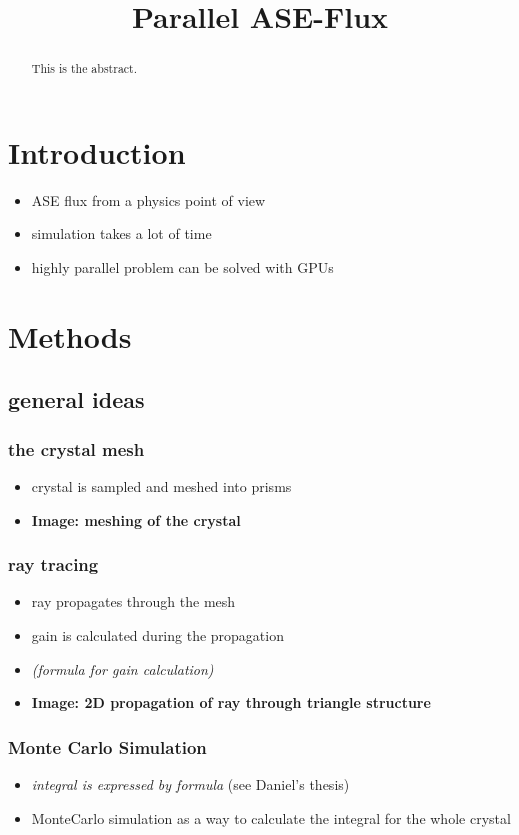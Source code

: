 \documentclass[a4paper,11pt]{article}
\title{Parallel ASE-Flux}
\begin{document}
\maketitle
\begin{abstract}
This is the abstract.
\end{abstract}

\section{Introduction}
\begin{itemize}
  \item ASE flux from a physics point of view
  \item simulation takes a lot of time
  \item highly parallel problem can be solved with GPUs
\end{itemize}


\section{Methods}
\subsection{general ideas}

\subsubsection{the crystal mesh}
\begin{itemize}
  \item crystal is sampled and meshed into prisms
  \item \textbf{Image: meshing of the crystal}
\end{itemize}

\subsubsection{ray tracing}
\begin{itemize}
  \item ray propagates through the mesh
  \item gain is calculated during the propagation
  \item \textit{(formula for gain calculation)}
  \item \textbf{Image: 2D propagation of ray through triangle structure}
\end{itemize}

\subsubsection{Monte Carlo Simulation}
\begin{itemize}
  \item \textit{integral is expressed by formula} (see Daniel's thesis)
  \item MonteCarlo simulation as a way to calculate the integral for the whole crystal
\end{itemize}
\end{document}
